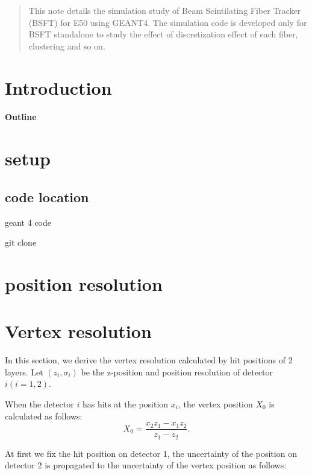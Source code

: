 \documentclass[12pt]{article}
\begin{document}
\maketitle

\begin{abstract}
This note details the simulation study of Beam Scintilating Fiber Tracker (BSFT) for E50 using GEANT4. The simulation code is developed only for BSFT standalone to study the effect of discretization effect of each fiber, clustering and so on.
\end{abstract}

\newpage
\tableofcontents
\newpage

\section{Introduction}

\paragraph{Outline}

\section{setup}

\subsection{code location}
geant 4 code 
\begin{screen}
git clone
\end{screen}

\section{position resolution}


\section{Vertex resolution}
In this section, we derive the vertex resolution calculated by hit positions of 2 layers. 
Let $(z_i,\sigma_i)$ be the z-position and position resolution of detector $i (i=1,2)$.


When the detector $i$ has hits at the position $x_i$, the vertex position $X_0$ is calculated as follows:
\[
X_0 = \frac{x_2z_1 - x_1z_2}{z_1 - z_2}.
\]

At first we fix the hit position on detector 1, the uncertainty of the position on detector 2 is propagated to the uncertainty of the vertex position as follows:
\end{document}

